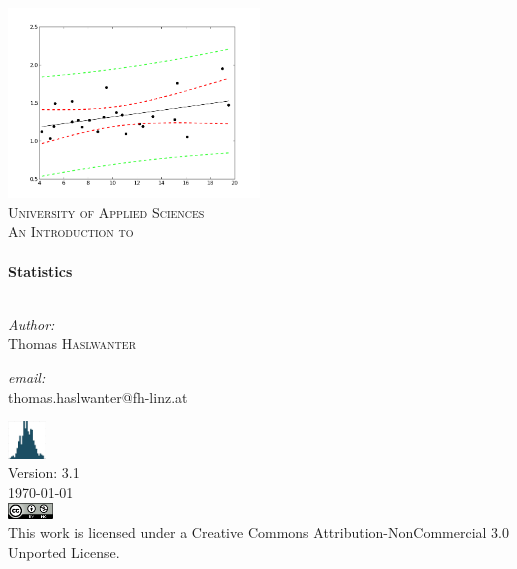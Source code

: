 \begin{titlepage}

\begin{center}


\includegraphics[width=0.5\textwidth]{../Images/regression.png}\\[1cm]

\textsc{\LARGE University of Applied Sciences }\\[1.5cm]

\textsc{\Large An Introduction to}\\[0.5cm]


\HRule \\[0.4cm]
{ \huge \bfseries Statistics}\\[0.4cm]

\HRule \\[1.5cm]

\begin{minipage}{0.4\textwidth}
\begin{flushleft} \large
\emph{Author:}\\
Thomas \textsc{Haslwanter}
\end{flushleft}
\end{minipage}
\begin{minipage}{0.4\textwidth}
\begin{flushright} \large
\emph{email:} \\
{\small thomas.haslwanter@fh-linz.at}
\end{flushright}
\end{minipage}

\vfill

\includegraphics[width=1cm]{../Images/StatsLogo_green.png}\\
Version: 3.1 \\
{\large \today} \\[1cm]
\includegraphics[width=1.2cm]{../Images/cc_licence.png}\\
\footnotesize{This work is licensed under a Creative Commons Attribution-NonCommercial 3.0 Unported License.}


\end{center}

\end{titlepage}
